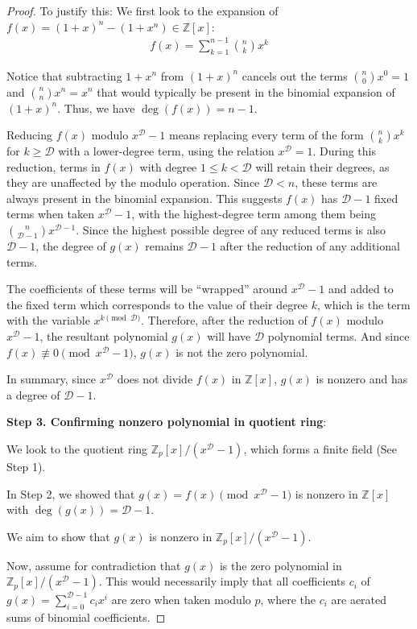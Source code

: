 \documentclass{article}
\theoremstyle{plain}
\theoremstyle{definition}
\newcommand{\D}{\mathcal{D}}
\begin{document}
\begin{proof}
To justify this: We first look to the expansion of  $f(x) = (1 + x)^n - (1 + x^n) \in \mathbb{Z}[x]$:
\begin{align}
    f(x) = \sum_{k=1}^{n-1} \binom{n}{k} x^k
\end{align}

Notice that subtracting $1+x^n$ from $(1+x)^n$ cancels out the terms $\binom{n}{0} x^0 = 1$ and $\binom{n}{n} x^n = x^n$ that would typically be present in the binomial expansion of $(1+x)^n$. Thus, we have $\deg(f(x))=n-1$.

Reducing $f(x)$ modulo $x^{\D} - 1$ means replacing every term of the form $\binom{n}{k} x^k$ for $k \geq \D$ with a lower-degree term, using the relation $x^\D = 1$. During this reduction, terms in $f(x)$ with degree $1 \leq k < \D$ will retain their degrees, as they are unaffected by the modulo operation. Since $\D < n$, these terms are always present in the binomial expansion. This suggests $f(x)$ has $\D-1$ fixed terms when taken $x^\D - 1$,  with the highest-degree term among them being $\binom{n}{\D-1} x^{\D-1}$. Since the highest possible degree of any reduced terms is also $\D-1$, the degree of $g(x)$ remains $\D-1$ after the reduction of any additional terms.

The coefficients of these terms will be ``wrapped'' around $x^\D - 1$ and added to the fixed term which corresponds to the value of their degree $k$, which is the term with the variable $x^{k \pmod{\D}}$. Therefore, after the reduction of $f(x)$ modulo $x^\D - 1$, the resultant polynomial $g(x)$ will have $\D$ polynomial terms. And since $f(x) \not\equiv 0 \pmod{x^\D - 1}$, $g(x)$ is not the zero polynomial.

In summary, since $x^\D $ does not divide $f(x)$ in $\mathbb{Z}[x]$, $g(x)$ is nonzero and has a degree of $\D-1$.

\textbf{Step 3. Confirming nonzero polynomial in quotient ring}:

We look to the quotient ring $\mathbb{Z}_p[x]/(x^{\D} - 1)$, which forms a finite field (See Step 1).

In Step 2, we showed that $g(x) = f(x) \pmod{x^{\D} - 1}$ is nonzero in $\mathbb{Z}[x]$ with $\deg(g(x)) = \D-1$.

We aim to show that $g(x)$ is nonzero in $\mathbb{Z}_p[x]/(x^{\D} - 1)$.

Now, assume for contradiction that $g(x)$ is the zero polynomial in $\mathbb{Z}_p[x]/(x^{\D} - 1)$. This would necessarily imply that all coefficients $c_i$ of $g(x) = \sum_{i=0}^{\D-1} c_i x^i$ are zero when taken modulo $p$, where the $c_i$ are aerated sums of binomial coefficients.


\end{proof}
\end{document}
